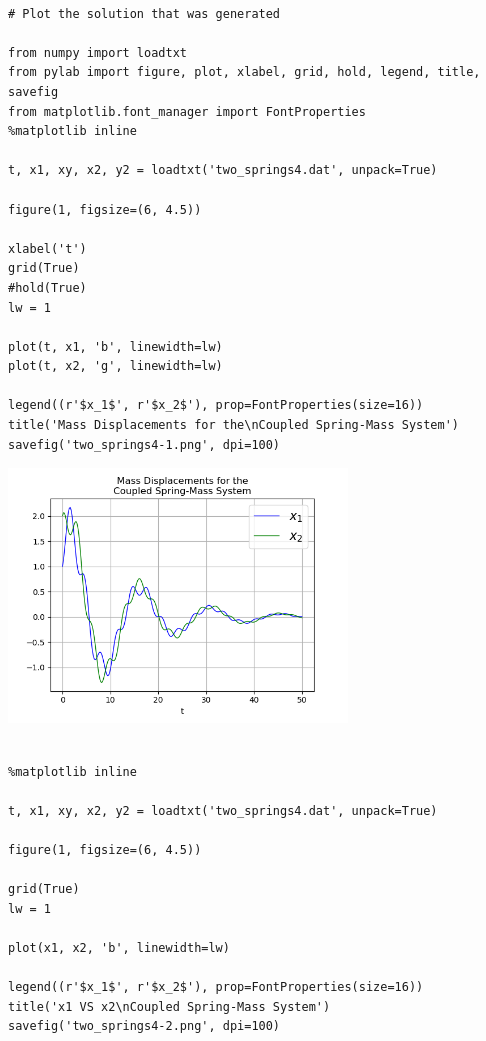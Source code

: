 \documentclass{article} %
\begin{document}
\begin{verbatim} 

# Plot the solution that was generated

from numpy import loadtxt
from pylab import figure, plot, xlabel, grid, hold, legend, title, savefig
from matplotlib.font_manager import FontProperties
%matplotlib inline

t, x1, xy, x2, y2 = loadtxt('two_springs4.dat', unpack=True)

figure(1, figsize=(6, 4.5))

xlabel('t')
grid(True)
#hold(True)
lw = 1

plot(t, x1, 'b', linewidth=lw)
plot(t, x2, 'g', linewidth=lw)

legend((r'$x_1$', r'$x_2$'), prop=FontProperties(size=16))
title('Mass Displacements for the\nCoupled Spring-Mass System')
savefig('two_springs4-1.png', dpi=100)

\end{verbatim}



\begin{center}
 	\includegraphics[width=9cm]{two_springs4-1.png}
 \end{center}



\begin{verbatim} 

%matplotlib inline

t, x1, xy, x2, y2 = loadtxt('two_springs4.dat', unpack=True)

figure(1, figsize=(6, 4.5))

grid(True)
lw = 1

plot(x1, x2, 'b', linewidth=lw)

legend((r'$x_1$', r'$x_2$'), prop=FontProperties(size=16))
title('x1 VS x2\nCoupled Spring-Mass System')
savefig('two_springs4-2.png', dpi=100)

\end{verbatim}
\end{document}
